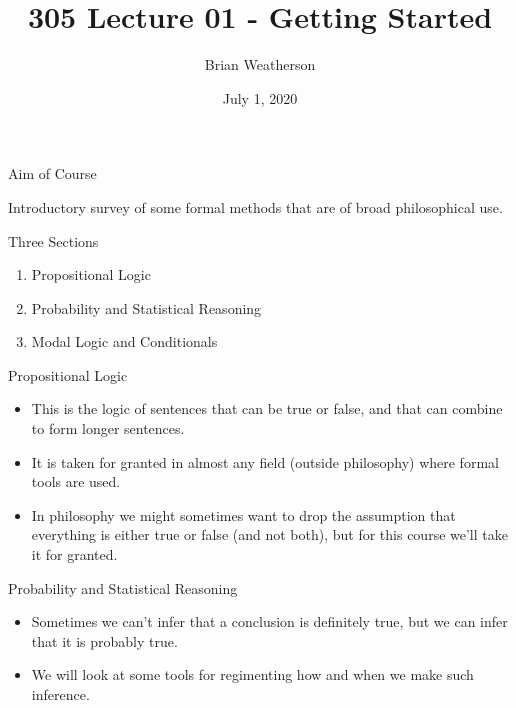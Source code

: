 \documentclass[ignorenonframetext,]{beamer}
\title{305 Lecture 01 - Getting Started}
\author{Brian Weatherson}
\date{July 1, 2020}
\providecommand{\tightlist}{%
  \setlength{\itemsep}{0pt}\setlength{\parskip}{0pt}}
\renewcommand{\,}{\text{, }}
\begin{document}
\frame{\titlepage}

\begin{frame}{Aim of Course}
\protect\hypertarget{aim-of-course}{}

Introductory survey of some formal methods that are of broad
philosophical use.

\end{frame}

\begin{frame}{Three Sections}
\protect\hypertarget{three-sections}{}

\begin{enumerate}
\tightlist
\item
  Propositional Logic
\item
  Probability and Statistical Reasoning
\item
  Modal Logic and Conditionals
\end{enumerate}

\end{frame}

\begin{frame}{Propositional Logic}
\protect\hypertarget{propositional-logic}{}

\begin{itemize}[<+->]
\tightlist
\item
  This is the logic of sentences that can be true or false, and that can
  combine to form longer sentences.
\item
  It is taken for granted in almost any field (outside philosophy) where
  formal tools are used.
\item
  In philosophy we might sometimes want to drop the assumption that
  everything is either true or false (and not both), but for this course
  we'll take it for granted.
\end{itemize}

\end{frame}

\begin{frame}{Probability and Statistical Reasoning}
\protect\hypertarget{probability-and-statistical-reasoning}{}

\begin{itemize}[<+->]
\tightlist
\item
  Sometimes we can't infer that a conclusion is definitely true, but we
  can infer that it is probably true.
\item
  We will look at some tools for regimenting how and when we make such
  inference.
\end{itemize}

\end{frame}
\end{document}
